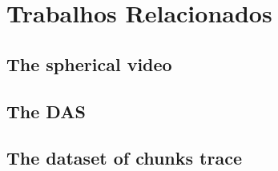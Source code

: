 \chapter{Trabalhos Relacionados}\label{Cap:Related Works}
	
\section{The spherical video}
	
\section{The DAS}

\section{The dataset of chunks trace}